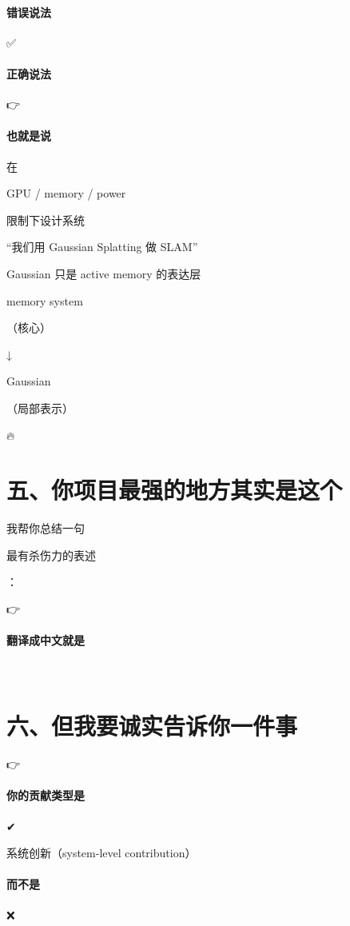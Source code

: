 \documentclass[12pt]{article}
\begin{document}
\paragraph{错误说法}
✅

\paragraph{正确说法}
👉

\paragraph{也就是说}
在

GPU / memory / power

限制下设计系统

“我们用 Gaussian Splatting 做 SLAM”

Gaussian 只是 active memory 的表达层

memory system

（核⼼）

↓

Gaussian

（局部表⽰）

🔥

\section{五、你项目最强的地方其实是这个}
我帮你总结一句

最有杀伤力的表述

：

👉

\paragraph{翻译成中文就是}
🚨

\section{六、但我要诚实告诉你一件事}
👉

\paragraph{你的贡献类型是}
✔

系统创新（system-level contribution）

\paragraph{而不是}
❌
\end{document}
